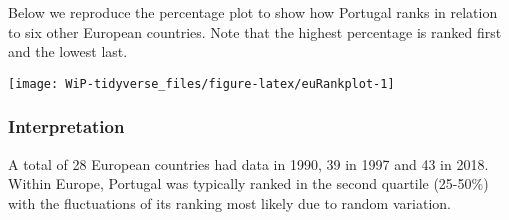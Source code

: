 \documentclass[a4paper,9pt,twocolumn,twoside,]{pinp}
\begin{document}
Below we reproduce the percentage plot to show how Portugal ranks in
relation to six other European countries. Note that the highest
percentage is ranked first and the lowest last.

\begin{Shaded}
\end{Shaded}

\begin{center}\texttt{[image: WiP-tidyverse\_files/figure-latex/euRankplot-1]} \end{center}

\hypertarget{interpretation-4}{%
\subsubsection{Interpretation}\label{interpretation-4}}

A total of 28 European countries had data in 1990, 39 in 1997 and 43 in
2018. Within Europe, Portugal was typically ranked in the second
quartile (25-50\%) with the fluctuations of its ranking most likely due
to random variation.
\end{document}
